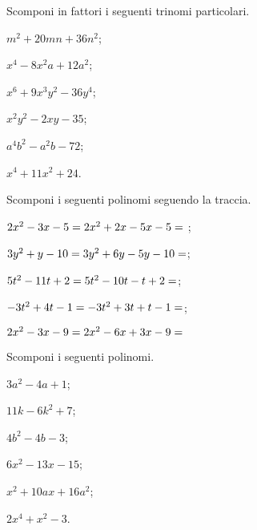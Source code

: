 \begin{esercizio}
 \label{ese:13.77}
 Scomponi in fattori i seguenti trinomi particolari.
 \begin{multicols}{3}
 \begin{enumeratea}
 \item $m^{2}+20mn+36n^{2}$;
 \item $x^{4}-8x^{2}a+12a^{2}$;
 \item $x^{6}+9x^{3}y^{2}-36y^{4}$;
 \item $x^{2}y^{2}-2xy-35$;
 \item $a^{4}b^{2}-a^{2}b-72$;
 \item $x^{4}+11x^{2}+24$.
 \end{enumeratea}
\end{multicols}
\end{esercizio}
\pagebreak
\begin{esercizio}[\Ast]
 \label{ese:13.78}
 Scomponi i seguenti polinomi seguendo la
traccia.
 \begin{enumeratea}
 \item $2x^{{2}}-3x-5=2x^{2}+2x-5x-5=\dotfill~$;
 \item $3y^{{2}}+y-10 = 3y^{2}+6y-5y-10 =\dotfill$;
 \item $5t^{{2}}-11t+2 = 5t^{2}-10t-t+2 =\dotfill$;
 \item $-3t^{{2}}+4t-1= -3t^{2}+3t+t-1 = \dotfill$;
 \item $2x^{2}-3x-9= 2x^{2}-6x+3x-9 = \dotfill$
 \end{enumeratea}
\end{esercizio}

\begin{esercizio}
 \label{ese:13.79}
 Scomponi i seguenti polinomi.
\begin{multicols}{3}
 \begin{enumeratea}
 \item $3a^{{2}}-4a+1$;
 \item $11k-6k^{2}+7$;
 \item $4b^{{2}}-4b-3$;
 \item $6x^{2}-13x-15$;
 \item $x^{2}+10ax+16a^{2}$;
 \item $2x^{{4}}+x^{{2}}-3$.
 \end{enumeratea}
\end{multicols}
 \end{esercizio}


